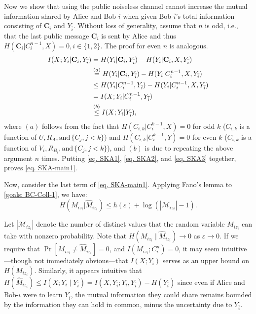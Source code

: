 \documentclass[runningheads]{llncs}
\newcommand{\parbreak}{ \vspace{0.3 em}}
\begin{document}
Now we show that using the public noiseless channel cannot increase the mutual information shared by Alice and Bob-$i$ when given Bob-$\overline{i}$’s total information consisting of $\mathbf{C}_i$ and $Y_{\overline{i}}$. Without loss of generality, assume that $n$ is odd, i.e., that the last public message $\mathbf{C}_i$ is sent by Alice and thus $H(\mathbf{C}_i | C_i^{n-1}, X) = 0, i\in\{1,2\}$. The proof for even $n$ is analogous.
\begin{align}
I(X; Y_i | \mathbf{C}_i, Y_{\overline{i}}) &= H(Y_i | \mathbf{C}_i, Y_{\overline{i}}) - H(Y_i | \mathbf{C}_i, X,Y_{\overline{i}}) \notag\\
& \stackrel{(a)}{=} H(Y_i | \mathbf{C}_i ,Y_{\overline{i}}) - H(Y_i | C_i^{n-1} ,X,Y_{\overline{i}})\notag \\
&\leq H(Y_i | C_i^{n-1} ,Y_{\overline{i}}) - H(Y_i | C_i^{n-1} ,X,Y_{\overline{i}})\notag \\\label{eq. SKA3'}
& = I(X; Y_i | C_i^{n-1} ,Y_{\overline{i}})\\\label{eq. SKA3}
& \stackrel{(b)}{\leq} I(X;Y_i|Y_{\overline{i}}),
\end{align}
where $(a)$ follows from the fact that $H(C_{i,k}|C_i^{k-1}, X) = 0$ for odd $k$ ($C_{i,k}$ is a function of $U, R_A, \text{and}\,\{C_j, j<k\}$) and $H(C_{i,k}|C_i^{k-1}, Y) = 0$ for even $k$ ($C_{i,k}$ is a function of $V_i, R_{B_i}, \text{and}\,\{C_j, j<k\}$), and $(b)$ is due to repeating the above argument $n$ times. Putting \eqref{eq. SKA1}, \eqref{eq. SKA2}, and \eqref{eq. SKA3} together, proves \eqref{eq. SKA-main1}.

\parbreak Now, consider the last term of \eqref{eq. SKA-main1}. Applying Fano's lemma to \eqref{goals: BC-Coll-1}, we have:
\begin{equation}\label{eq. SKA4}
    H(M_{iz_i} | \hat{M}_{iz_i})\leq h(\varepsilon) + \log (|\mathcal{M}_{iz_i}|-1).
\end{equation}

Let $|\mathcal{M}_{iz_i}|$ denote the number of distinct values that the random variable $M_{iz_i}$ can take with nonzero probability. Note that $H(M_{iz_i} \mid \hat{M}_{iz_i}) \to 0$ as $\varepsilon \to 0$. If we require that $\Pr[M_{iz_i} \neq \hat{M}_{iz_i}] = 0$, and $I(M_{iz_i}; C_i^n) = 0$, it may seem intuitive—though not immediately obvious—that $I(X; Y_i)$ serves as an upper bound on $H(M_{iz_i})$. Similarly, it appears intuitive that $H(\hat{M}_{iz_i}) \leq I(X; Y_i \mid Y_{\overline{i}}) = I(X,Y_{\overline{i}}; Y_i,Y_{\overline{i}}) - H(Y_{\overline{i}})$ since even if Alice and Bob-$i$ were to learn $Y_{\overline{i}}$, the mutual information they could share remains bounded by the information they can hold in common, minus the uncertainty due to $Y_{\overline{i}}$.
\end{document}
